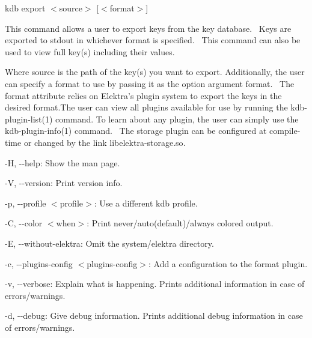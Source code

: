 {\ttfamily kdb export $<$source$>$ \mbox{[}$<$format$>$\mbox{]}}~\newline


This command allows a user to export keys from the key database.~\newline
 Keys are exported to {\ttfamily stdout} in whichever format is specified.~\newline
 This command can also be used to view full key(s) including their values.~\newline


Where {\ttfamily source} is the path of the key(s) you want to export. Additionally, the user can specify a format to use by passing it as the option argument {\ttfamily format}.~\newline
 The {\ttfamily format} attribute relies on Elektra’s plugin system to export the keys in the desired format.\+The user can view all plugins available for use by running the kdb-\/plugin-\/list(1) command. To learn about any plugin, the user can simply use the kdb-\/plugin-\/info(1) command.~\newline
 The {\ttfamily storage} plugin can be configured at compile-\/time or changed by the link {\ttfamily libelektra-\/storage.\+so}.


\begin{DoxyItemize}
\item {\ttfamily -\/H}, {\ttfamily -\/-\/help}\+: Show the man page.
\item {\ttfamily -\/V}, {\ttfamily -\/-\/version}\+: Print version info.
\item {\ttfamily -\/p}, {\ttfamily -\/-\/profile $<$profile$>$}\+: Use a different kdb profile.
\item {\ttfamily -\/C}, {\ttfamily -\/-\/color $<$when$>$}\+: Print never/auto(default)/always colored output.
\item {\ttfamily -\/E}, {\ttfamily -\/-\/without-\/elektra}\+: Omit the {\ttfamily system/elektra} directory.
\item {\ttfamily -\/c}, {\ttfamily -\/-\/plugins-\/config $<$plugins-\/config$>$}\+: Add a configuration to the format plugin.
\item {\ttfamily -\/v}, {\ttfamily -\/-\/verbose}\+: Explain what is happening. Prints additional information in case of errors/warnings.
\item {\ttfamily -\/d}, {\ttfamily -\/-\/debug}\+: Give debug information. Prints additional debug information in case of errors/warnings.
\end{DoxyItemize}


